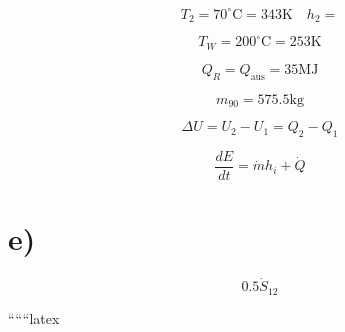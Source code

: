 \[
T_2 = 70^\circ \text{C} = 343 \text{K} \quad h_2 =
\]

\[
T_W = 200^\circ \text{C} = 253 \text{K}
\]

\[
Q_R = Q_{\text{aus}} = 35 \text{MJ}
\]

\[
m_{90} = 575.5 \text{kg}
\]

\[
\Delta U = U_2 - U_1 = Q_2 - Q_1
\]

\[
\frac{dE}{dt} = \dot{m} h_i + \dot{Q}
\]

\section*{e)}
\[
0.5 \dot{S}_{12}
\]

``````latex


